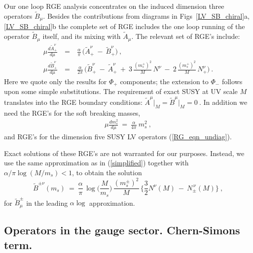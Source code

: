 \documentclass[12pt]{revtex4}
\begin{document}
Our one loop RGE analysis concentrates on the induced dimension three 
operators $ \widetilde{B}_\mu $. Besides the contributions from
diagrams in Figs~\ref{LV_SB_chiral}a, \ref{LV_SB_chiral}b the 
complete set of RGE includes the one loop running of the operator $
\widetilde{B}_\mu $ itself, and its mixing with $ \widetilde{A}_\mu $.
The relevant set of RGE's include: 
\begin{eqnarray}
\label{RG_AB}
\nonumber
\mu\frac{d \widetilde{A}_+^\nu}{d\mu} 
& ~=~ &
\frac{\alpha}{\pi} \,  \Big(  \widetilde{A}_+^\nu  
~-~\widetilde{B}_+^\nu \Big)~, 
        \\
\mu\frac{d \widetilde{B}_+^\nu}{d\mu} 
& ~=~ &
\frac{\alpha}{2\pi} \, \Big(
\widetilde{B}_+^\nu  ~-~ \widetilde{A}_+^\nu  
~+~3\, \frac{(m_s^+)^2}{M}\, N^\nu 
~-~2\, \frac{(m_s^+)^2}{M}\, N_+^\nu 
\Big)~.
\end{eqnarray}
%
Here we quote only the results for $\Phi_+$ components; the extension
to $\Phi_-$ follows upon some simple substitutions. The requirement of
exact SUSY at UV scale $M$ translates into the RGE boundary
conditions:
\( 
\widetilde{A}^\mu \Bigr|_M = \widetilde{B}^\mu \Bigr|_M = 0~.
\) 
In addition we need the RGE's for the soft breaking masses, 
%
\begin{eqnarray}
       \mu \frac{d m_s^2}
               {d\mu}            ~ =~ 
        \frac{\alpha}{4\pi}~ m_s^2~,
\end{eqnarray}
%
and RGE's for the dimension five SUSY LV operators
(\ref{RG_eqn_undiag}).   

Exact solutions of these RGE's are not
warranted for our purposes. Instead, we use the same approximation as
in (\ref{simplified}) together with  
$ \alpha/\pi \log (M/m_s) < 1$,
to obtain the solution 
\begin{equation}
\label{B_mu_coef}
\widetilde{B}^{\pm\nu} (m_s) ~=~ \frac{\alpha}{\pi}\, 
\log \big(\frac{M}{m_s}\big)\,
\frac{(m_{s}^\pm)^2 }{M}\, 
\Big\{ 
\frac{3}
     {2} N^\nu(M) 
~-~ N_\pm^{\,\nu}(M)
\Big\}~,
\end{equation}
%
for $\widetilde{B}^\pm_\mu$ in the leading 
$\alpha\log$ approximation.




\subsection{Operators in the gauge sector. Chern-Simons term.}
\label{SB_gauge_sector}
   
\end{document}
